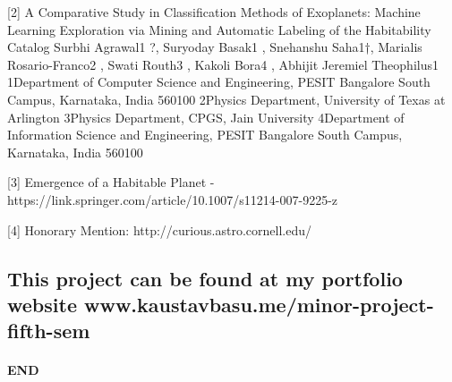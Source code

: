 \documentclass[11pt]{article}
\begin{document}
{[}2{]} A Comparative Study in Classification Methods of Exoplanets:
Machine Learning Exploration via Mining and Automatic Labeling of the
Habitability Catalog Surbhi Agrawal1 ?, Suryoday Basak1 , Snehanshu
Saha1†, Marialis Rosario-Franco2 , Swati Routh3 , Kakoli Bora4 , Abhijit
Jeremiel Theophilus1 1Department of Computer Science and Engineering,
PESIT Bangalore South Campus, Karnataka, India 560100 2Physics
Department, University of Texas at Arlington 3Physics Department, CPGS,
Jain University 4Department of Information Science and Engineering,
PESIT Bangalore South Campus, Karnataka, India 560100

{[}3{]} Emergence of a Habitable Planet -
https://link.springer.com/article/10.1007/s11214-007-9225-z

{[}4{]} Honorary Mention: http://curious.astro.cornell.edu/

    \subsection{This project can be found at my portfolio website
www.kaustavbasu.me/minor-project-fifth-sem}\label{this-project-can-be-found-at-my-portfolio-website-www.kaustavbasu.meminor-project-fifth-sem}

\paragraph{END}\label{end}


    
    
    
    
\end{document}
